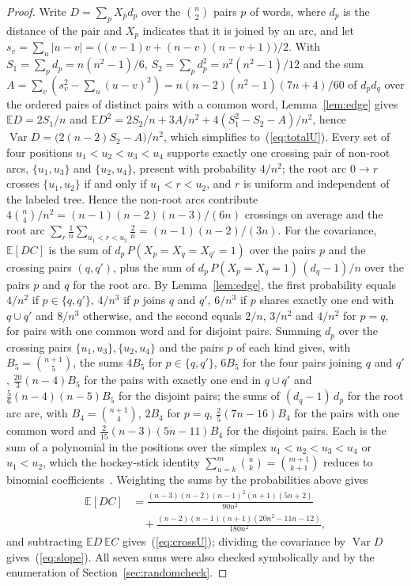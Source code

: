 \documentclass[mathematics,article,submit,pdftex,oneauthor]{Definitions/mdpi}
\newcommand{\E}{\mathbb E}
\newcommand{\Var}{\operatorname{Var}}
\begin{document}
\begin{proof}
Write $D=\sum_pX_pd_p$ over the $\binom n2$ pairs $p$ of words, where $d_p$ is the distance of the pair and $X_p$ indicates that it is joined by an arc, and let $s_v=\sum_u|u-v|=\bigl((v-1)v+(n-v)(n-v+1)\bigr)/2$.
With $S_1=\sum_pd_p=n(n^2-1)/6$, $S_2=\sum_pd_p^2=n^2(n^2-1)/12$ and the sum $A=\sum_v(s_v^2-\sum_u(u-v)^2)=n(n-2)(n^2-1)(7n+4)/60$ of $d_pd_q$ over the ordered pairs of distinct pairs with a common word, Lemma~\ref{lem:edge} gives $\E D=2S_1/n$ and $\E D^2=2S_2/n+3A/n^2+4(S_1^2-S_2-A)/n^2$, hence $\Var D=\bigl(2(n-2)S_2-A\bigr)/n^2$, which simplifies to~(\ref{eq:totalU}).
Every set of four positions $u_1<u_2<u_3<u_4$ supports exactly one crossing pair of non-root arcs, $\{u_1,u_3\}$ and $\{u_2,u_4\}$, present with probability $4/n^2$; the root arc $0\to r$ crosses $\{u_1,u_2\}$ if and only if $u_1<r<u_2$, and $r$ is uniform and independent of the labeled tree.
Hence the non-root arcs contribute $4\binom n4/n^2=(n-1)(n-2)(n-3)/(6n)$ crossings on average and the root arc $\sum_r\frac1n\sum_{u_1<r<u_2}\frac2n=(n-1)(n-2)/(3n)$.
For the covariance, $\E[DC]$ is the sum of $d_p\,P(X_p=X_q=X_{q'}=1)$ over the pairs $p$ and the crossing pairs $(q,q')$, plus the sum of $d_p\,P(X_p=X_q=1)\,(d_q-1)/n$ over the pairs $p$ and $q$ for the root arc.
By Lemma~\ref{lem:edge}, the first probability equals $4/n^2$ if $p\in\{q,q'\}$, $4/n^3$ if $p$ joins $q$ and $q'$, $6/n^3$ if $p$ shares exactly one end with $q\cup q'$ and $8/n^3$ otherwise, and the second equals $2/n$, $3/n^2$ and $4/n^2$ for $p=q$, for pairs with one common word and for disjoint pairs.
Summing $d_p$ over the crossing pairs $\{u_1,u_3\},\{u_2,u_4\}$ and the pairs $p$ of each kind gives, with $B_5=\binom{n+1}{5}$, the sums $4B_5$ for $p\in\{q,q'\}$, $6B_5$ for the four pairs joining $q$ and $q'$, $\frac{20}{3}(n-4)B_5$ for the pairs with exactly one end in $q\cup q'$ and $\frac56(n-4)(n-5)B_5$ for the disjoint pairs; the sums of $(d_q-1)\,d_p$ for the root arc are, with $B_4=\binom{n+1}{4}$, $2B_4$ for $p=q$, $\frac25(7n-16)B_4$ for the pairs with one common word and $\frac{2}{15}(n-3)(5n-11)B_4$ for the disjoint pairs.
Each is the sum of a polynomial in the positions over the simplex $u_1<u_2<u_3<u_4$ or $u_1<u_2$, which the hockey-stick identity $\sum_{u=k}^{m}\binom uk=\binom{m+1}{k+1}$ reduces to binomial coefficients~\cite{Graham1994}.
Weighting the sums by the probabilities above gives
\begin{align*}
\E[DC]&=\frac{(n-3)(n-2)(n-1)^2(n+1)(5n+2)}{90n^2}\\
&\quad+\frac{(n-2)(n-1)(n+1)(20n^2-11n-12)}{180n^2},
\end{align*}
and subtracting $\E D\,\E C$ gives~(\ref{eq:crossU}); dividing the covariance by $\Var D$ gives~(\ref{eq:slope}).
All seven sums were also checked symbolically and by the enumeration of Section~\ref{sec:randomcheck}.
\end{proof}
\end{document}
